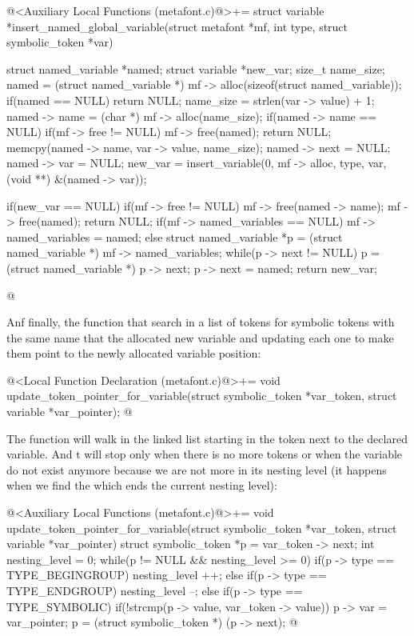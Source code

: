 \iniciocodigo
@<Auxiliary Local Functions (metafont.c)@>+=
struct variable *insert_named_global_variable(struct metafont *mf,
                                             int type,
                                             struct symbolic_token *var){
  struct named_variable *named;
  struct variable *new_var;
  size_t name_size;
  named = (struct named_variable *)
              mf -> alloc(sizeof(struct named_variable));
  if(named == NULL)
    return NULL;
  name_size = strlen(var -> value) + 1;
  named -> name = (char *) mf -> alloc(name_size);
  if(named -> name == NULL){
    if(mf -> free != NULL)
      mf -> free(named);
    return NULL;
  }
  memcpy(named -> name, var -> value, name_size);
  named -> next = NULL;
  named -> var = NULL;
  new_var = insert_variable(0, mf -> alloc, type, var,
                           (void **) &(named -> var));

  if(new_var == NULL){
    if(mf -> free != NULL){
      mf -> free(named -> name);
      mf -> free(named);
      return NULL;
    }
  }
  if(mf -> named_variables == NULL)
    mf -> named_variables = named;
  else{
    struct named_variable *p = (struct named_variable *)
                                   mf -> named_variables;
    while(p -> next != NULL)
      p = (struct named_variable *) p -> next;
    p -> next = named;
  }
  return new_var;
}
@
\fimcodigo

Anf finally, the function that search in a list of tokens for symbolic
tokens with the same name that the allocated new variable and updating
each one to make them point to the newly allocated variable position:

\iniciocodigo
@<Local Function Declaration (metafont.c)@>+=
void update_token_pointer_for_variable(struct symbolic_token *var_token,
                                      struct variable *var_pointer);
@
\fimcodigo

The function will walk in the linked list starting in the token next
to the declared variable. And t will stop only when there is no more
tokens or when the variable do not exist anymore because we are not
more in its nesting level (it happens when we find
the  which ends the current nesting level):

\iniciocodigo
@<Auxiliary Local Functions (metafont.c)@>+=
void update_token_pointer_for_variable(struct symbolic_token *var_token,
                                      struct variable *var_pointer){
  struct symbolic_token *p = var_token -> next;
  int nesting_level = 0;
  while(p != NULL && nesting_level >= 0){
    if(p -> type == TYPE_BEGINGROUP)
      nesting_level ++;
    else if(p -> type == TYPE_ENDGROUP)
      nesting_level --;
    else if(p -> type == TYPE_SYMBOLIC){
      if(!strcmp(p -> value, var_token -> value)){
        p -> var = var_pointer;
      }
    }
    p = (struct symbolic_token *) (p -> next);
  }
}
@
\fimcodigo



